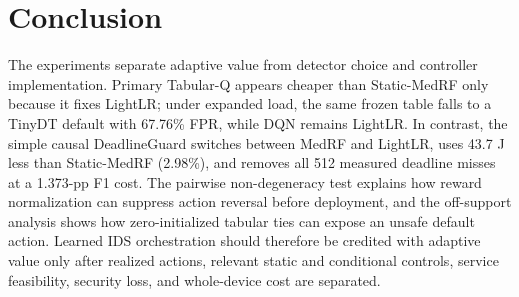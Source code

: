 \section{Conclusion}
The experiments separate adaptive value from detector choice and controller implementation. Primary Tabular-Q appears cheaper than Static-MedRF only because it fixes LightLR; under expanded load, the same frozen table falls to a TinyDT default with 67.76\% FPR, while DQN remains LightLR. In contrast, the simple causal DeadlineGuard switches between MedRF and LightLR, uses 43.7 J less than Static-MedRF (2.98\%), and removes all 512 measured deadline misses at a 1.373-pp F1 cost. The pairwise non-degeneracy test explains how reward normalization can suppress action reversal before deployment, and the off-support analysis shows how zero-initialized tabular ties can expose an unsafe default action. Learned IDS orchestration should therefore be credited with adaptive value only after realized actions, relevant static and conditional controls, service feasibility, security loss, and whole-device cost are separated.
